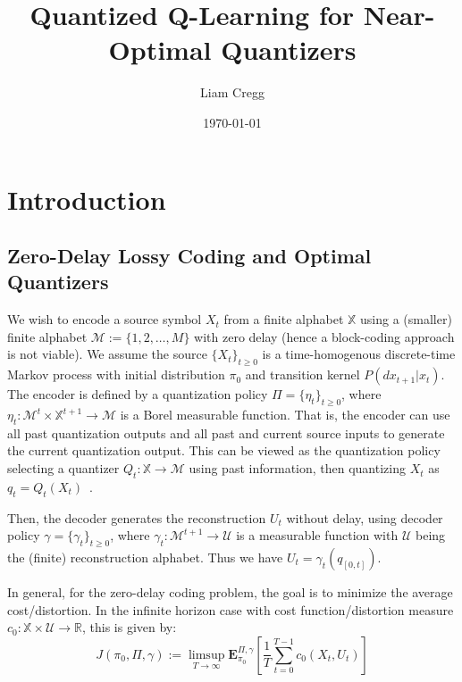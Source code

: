 \documentclass{article}
\title{Quantized Q-Learning for Near-Optimal Quantizers}
\date{\today}
\author{Liam Cregg}
\begin{document}
\begin{titlepage}
    \maketitle
\end{titlepage}

\newpage

\section{Introduction}
\subsection{Zero-Delay Lossy Coding and Optimal Quantizers}\label{optimal quantizers}
We wish to encode a source symbol \( X_t \) from a finite alphabet \( \mathbb{X} \) using a (smaller) finite alphabet \( \mathcal{M} := \{1, 2, \ldots, M\} \) with zero delay (hence a block-coding approach is not viable). We assume the source \( \{X_t\}_{t \ge 0} \) is a time-homogenous discrete-time Markov process with initial distribution \( \pi_0 \) and transition kernel \( P(dx_{t+1} | x_t) \). The encoder is defined by a quantization policy \( \Pi = \{\eta_t\}_{t \ge 0} \), where \( \eta_t : \mathcal{M}^t \times \mathbb{X}^{t+1} \to \mathcal{M} \) is a Borel measurable function. That is, the encoder can use all past quantization outputs and all past and current source inputs to generate the current quantization output. This can be viewed as the quantization policy selecting a quantizer \( Q_t : \mathbb{X} \to \mathcal{M} \) using past information, then quantizing \( X_t \) as \( q_t = Q_t(X_t) \)~\cite{Linder}. %

Then, the decoder generates the reconstruction \( U_t \) without delay, using decoder policy \( \gamma = \{\gamma_t\}_{t \ge 0} \), where \( \gamma_t : \mathcal{M}^{t+1} \to \mathcal{U} \) is a measurable function with \( \mathcal{U} \) being the (finite) reconstruction alphabet. Thus we have \( U_t = \gamma_t(q_{[0,t]}) \). %

In general, for the zero-delay coding problem, the goal is to minimize the average cost/distortion. In the infinite horizon case with cost function/distortion measure \( c_0 : \mathbb{X} \times \mathcal{U} \to \mathbb{R} \), this is given by:
\[ J(\pi_0, \Pi, \gamma) := \limsup_{T\to\infty}\mathbf{E}_{\pi_0}^{\Pi, \gamma}\left[\frac{1}{T}\sum_{t=0}^{T-1}c_0(X_t,U_t)\right] \]
\end{document}
